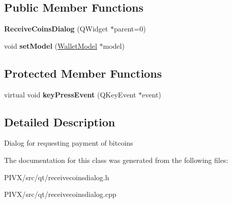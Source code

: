 \subsection*{Public Member Functions}
\begin{DoxyCompactItemize}
\item 
\mbox{\label{class_receive_coins_dialog_a0c982b94b7f23da8f208d09904352f89}} 
{\bfseries Receive\+Coins\+Dialog} (Q\+Widget $\ast$parent=0)
\item 
\mbox{\label{class_receive_coins_dialog_a856e5bbe280d792004e97e703f42c7f8}} 
void {\bfseries set\+Model} (\mbox{\hyperlink{class_wallet_model}{Wallet\+Model}} $\ast$model)
\end{DoxyCompactItemize}
\subsection*{Protected Member Functions}
\begin{DoxyCompactItemize}
\item 
\mbox{\label{class_receive_coins_dialog_abcf17b510c473bf3e94ef12f7f5cfc10}} 
virtual void {\bfseries key\+Press\+Event} (Q\+Key\+Event $\ast$event)
\end{DoxyCompactItemize}


\subsection{Detailed Description}
Dialog for requesting payment of bitcoins 

The documentation for this class was generated from the following files\+:\begin{DoxyCompactItemize}
\item 
P\+I\+V\+X/src/qt/receivecoinsdialog.\+h\item 
P\+I\+V\+X/src/qt/receivecoinsdialog.\+cpp\end{DoxyCompactItemize}
